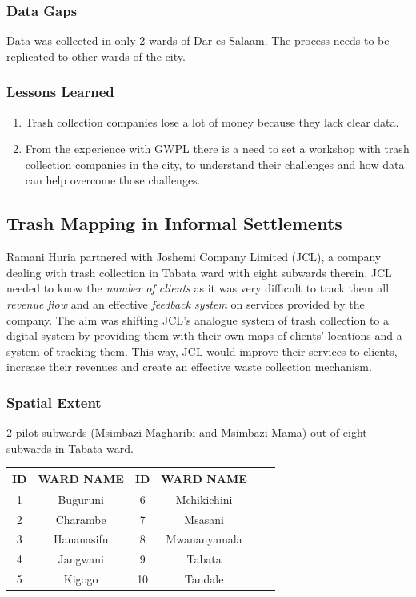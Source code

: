 \documentclass[a4paper,12pt,twoside]{article}
\begin{document}
\subsubsection{Data Gaps}
Data was collected in only 2 wards of Dar es Salaam. The process needs to be replicated to other wards of the city.

\subsubsection{Lessons Learned}
\begin{enumerate}
    \item Trash collection companies lose a lot of money because they lack clear data.

    \item From the experience with GWPL there is a need to set a workshop with trash collection companies in the city, to understand their challenges and how data can help overcome those challenges.
\end{enumerate}

\newpage
\subsection{Trash Mapping in Informal Settlements}

Ramani Huria partnered with Joshemi Company Limited (JCL), a company  dealing with trash collection in Tabata ward with eight subwards therein. JCL needed to know the \textit{number of clients} as it was very difficult to track them all \textit{revenue flow} and an effective \textit{feedback system} on services provided by the company. The aim was shifting JCL’s analogue system of trash collection to a digital system by providing them with their own maps of clients’ locations and a system of tracking them. This way, JCL would improve their services to clients, increase their revenues and create an effective waste collection mechanism.

\subsubsection {Spatial Extent}
2 pilot subwards (Msimbazi Magharibi and Msimbazi Mama) out of eight subwards in Tabata ward.

\begin{center}
\begin{tabular}{|c|c|c|c|c|c|}
\hline
ID & WARD NAME & ID & WARD NAME\\
\hline
1  & Buguruni & 6  & Mchikichini\\
2 &  Charambe & 7  & Msasani\\
3  & Hananasifu & 8  & Mwananyamala\\
4  & Jangwani & 9  & Tabata\\
5  & Kigogo & 10  & Tandale\\
 \hline
\end{tabular}
\end{center}
\end{document}
